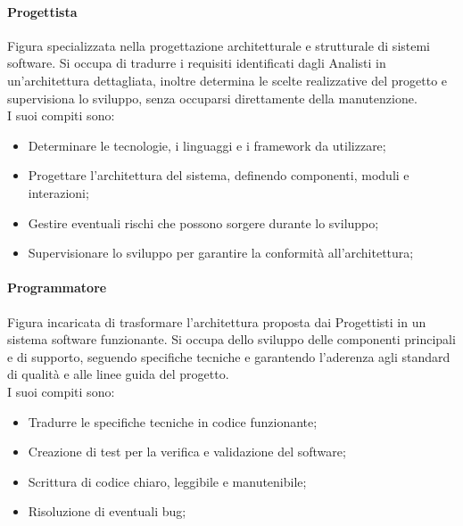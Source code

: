 \documentclass[10pt]{article}
\begin{document}
\begin{justify}
        \paragraph{Progettista}
        Figura specializzata nella progettazione architetturale e strutturale di sistemi software. Si occupa di tradurre i requisiti identificati dagli Analisti in un'architettura dettagliata, inoltre determina le scelte realizzative del progetto e supervisiona lo sviluppo, senza occuparsi direttamente della manutenzione.\\
        I suoi compiti sono:
        \begin{itemize}
            \item Determinare le tecnologie, i linguaggi e i framework da utilizzare;
            \item Progettare l'architettura del sistema, definendo componenti, moduli e interazioni;
            \item Gestire eventuali rischi che possono sorgere durante lo sviluppo;
            \item Supervisionare lo sviluppo per garantire la conformità all'architettura;
        \end{itemize}

        \paragraph{Programmatore}
        Figura incaricata di trasformare l’architettura proposta dai Progettisti in un sistema software funzionante. Si occupa dello sviluppo delle componenti principali e di supporto, seguendo specifiche tecniche e garantendo l’aderenza agli standard di qualità e alle linee guida del progetto.\\
        I suoi compiti sono:
        \begin{itemize}
            \item Tradurre le specifiche tecniche in codice funzionante;
            \item Creazione di test per la verifica e validazione del software;
            \item Scrittura di codice chiaro, leggibile e manutenibile;
            \item Risoluzione di eventuali bug;
        \end{itemize}


\end{justify}
\end{document}
